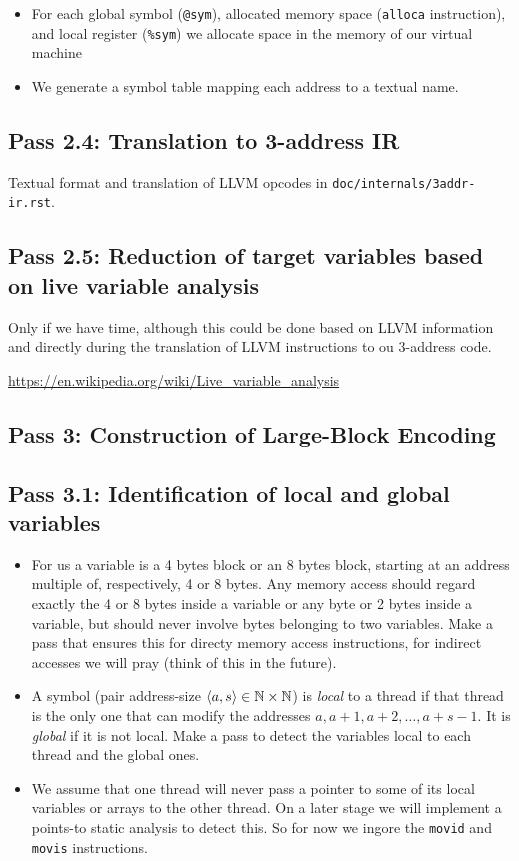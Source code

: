 \documentclass{llncs}
\begin{document}
\begin{itemize}
\item
  For each global symbol (\verb!@sym!), allocated memory space (\verb!alloca!
  instruction), and local register (\verb!%sym!) we allocate space in the
  memory of our virtual machine
\item
  We generate a symbol table mapping each address to a textual name.
\end{itemize}

\subsection*{Pass 2.4: Translation to 3-address IR}

Textual format and translation of LLVM opcodes in
\verb!doc/internals/3addr-ir.rst!.

\subsection*{Pass 2.5: Reduction of target variables based on live variable
analysis}

Only if we have time, although this could be done based on LLVM information and
directly during the translation of LLVM instructions to ou 3-address code.

\url{https://en.wikipedia.org/wiki/Live_variable_analysis}

\subsection*{Pass 3: Construction of Large-Block Encoding}

\subsection*{Pass 3.1: Identification of local and global variables}
\begin{itemize}
\item
  For us a variable is a 4 bytes block or an 8 bytes block, starting at an
  address multiple of, respectively, 4 or 8 bytes. Any memory access should
  regard exactly the 4 or 8 bytes inside a variable or any byte or 2 bytes inside a
  variable, but should never involve bytes belonging to two variables.
  Make a pass that ensures this for directy memory access instructions, for
  indirect accesses we will pray (think of this in the future).
\item
  A symbol (pair address-size $\langle a,s\rangle \in \mathbb{N} \times \mathbb{N}$) is \emph{local} to a
  thread if that thread is the only one that can modify the addresses
  $a, a+1, a+2, \ldots, a+s-1$.
  It is \emph{global} if it is not local.
  Make a pass to detect the variables local to each thread and the global ones.
\item
  We assume that one thread will never pass a pointer to some of its local
  variables or arrays to the other thread. On a later stage we will implement a
  points-to static analysis to detect this.
  So for now we ingore the \verb!movid! and \verb!movis! instructions.
\end{itemize}
\end{document}
